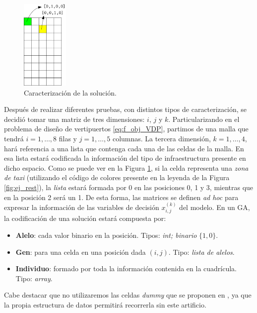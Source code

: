 \documentclass[12pt,a4paper]{book}
\begin{document}
\begin{figure}[H] 
    	\begin{center}
    	\includegraphics[width=0.2\textwidth]{img/caract_sol.png}
    	\end{center}
    	\caption{Caracterización de la solución.}
    	\label{fig:car_sol}
	\end{figure}

Después de realizar diferentes pruebas, con distintos tipos de caracterización, se decidió tomar una matriz de tres dimensiones: $i$, $j$ y $k$. Particularizando en el problema de diseño de vertipuertos \ref{eq:f_obj_VDP}, partimos de una malla que tendrá $i=1, \ldots, 8$ filas y $j=1, \ldots, 5$ columnas. La tercera dimensión, $k = 1,\ldots, 4$, hará referencia a una lista que contenga cada una de las celdas de la malla. En esa lista estará codificada la información del tipo de infraestructura presente en dicho espacio. Como se puede ver en la Figura \ref{fig:car_sol}, si la celda representa una \textsl{zona de taxi} (utilizando el código de colores presente en la leyenda de la Figura \ref{fig:ej_rest}), la \textsl{lista} estará formada por 0 en las posiciones 0, 1 y 3, mientras que en la posición 2 será un 1. De esta forma, las matrices se definen \textsl{ad hoc} para expresar la información de las variables de decisión $x_{i,j}^{(k)}$ del modelo. En un GA, la codificación de una solución estará compuesta por: 


\begin{itemize}
	\item \textbf{Alelo}: cada valor binario en la posición. Tipos: \textsl{int; binario} $\{1, 0\}$.
	\item \textbf{Gen}: para una celda en una posición dada $(i, j)$. Tipo: \textsl{lista de alelos}.
	\item \textbf{Individuo}: formado por toda la información contenida en la cuadrícula. Tipo: \textsl{array}.   
\end{itemize}


Cabe destacar que no utilizaremos las celdas \textsl{dummy} que se proponen en \cite{park_vertiport_2022}, ya que la propia estructura de datos permitirá recorrerla sin este artificio.  
	
\end{document}
